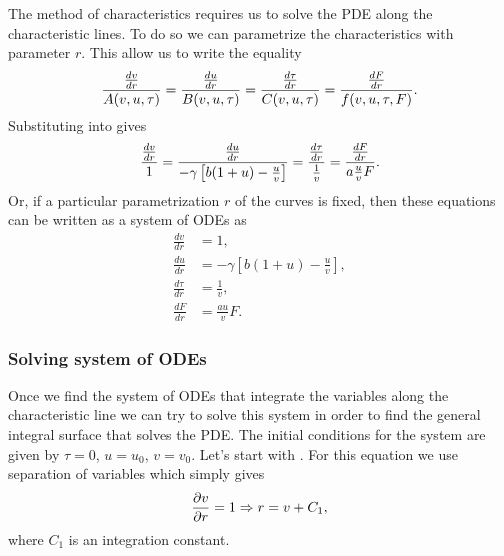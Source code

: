 The method of characteristics requires us to solve the PDE along the
characteristic lines. To do so we can parametrize the characteristics with
parameter $r$. This allow us to write the equality
\begin{equation}
  {{dv \over dr} \over A(v, u, \tau)} =
  {{du \over dr} \over B(v, u, \tau)} =
  {{d\tau \over dr} \over C(v, u, \tau)} =
  {{dF \over dr} \over f(v, u, \tau, F)}.
  \label{eq_lagrange_charpit}
\end{equation}
Substituting  into  gives
\begin{equation}
  {{dv \over dr} \over 1} =
  {{du \over dr} \over - \gamma \left[ b (1 + u) - \frac{u}{v} \right]} =
  {{d\tau \over dr} \over {1 \over v}} =
  {{dF \over dr} \over a \frac{u}{v} F}.
\end{equation}
Or, if a particular parametrization $r$ of the curves is fixed, then these
equations can be written as a system of ODEs as
\begin{align}
  \frac{d v}{d r} &= 1,
  \label{eq_ODE_1}\\
  \frac{d u}{d r} &= - \gamma \left[ b (1 + u) - \frac{u}{v}
  \right],
  \label{eq_ODE_2}\\
  \frac{d \tau}{d r} &= \frac{1}{v},
  \label{eq_ODE_3}\\
  \frac{d F}{d r} &= \frac{a u}{v} F.
  \label{eq_ODE_4}
\end{align}

\subsubsection{Solving system of ODEs}

Once we find the system of ODEs that integrate the variables along the
characteristic line we can try to solve this system in order to find the general
integral surface that solves the PDE. The initial conditions for the system are
given by $\tau = 0$, $u = u_0$, $v = v_0$. Let's start with \eref[eq_ODE_1].
For this equation we use separation of variables which simply gives
\begin{equation}
  {\partial v \over \partial r} = 1 \Rightarrow
  r = v + C_1,
  \label{eq_ODE_sol_1}
\end{equation}
where $C_1$ is an integration constant.

